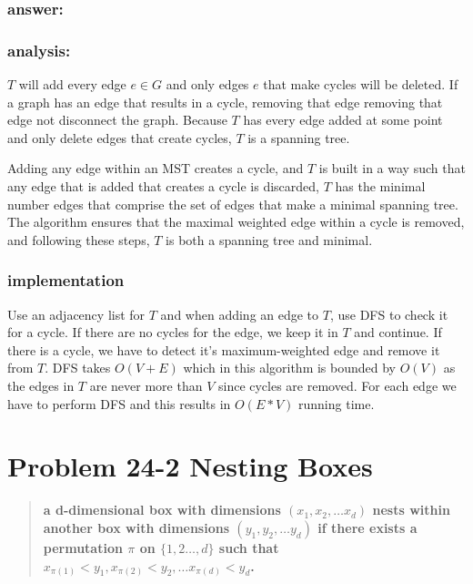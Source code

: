\documentclass[titlepage]{article}
\theoremstyle{definition}
\begin{document}
  \subsubsection{answer:}
  \subsubsection{analysis:}
    $T$ will add every edge $e \in G$ and only edges $e$ that make cycles will
    be deleted. If a graph has an edge that results in a cycle, removing that
    edge removing that edge not disconnect the graph. Because $T$ has every
    edge added at some point and only delete edges that create cycles, $T$ is a
    spanning tree. 

    Adding any  edge within an MST creates a cycle, and $T$ is built in a way
    such that any edge that is added that creates a cycle is discarded, $T$ has
    the minimal number edges that comprise the set of edges that make a minimal
    spanning tree. The algorithm ensures that the maximal weighted edge within
    a cycle is removed, and following these steps, $T$ is both a spanning tree
    and minimal. 

  \subsubsection{implementation}
  Use an adjacency list for $T$ and when adding an edge to $T$, use DFS to
  check it for a cycle. If there are no cycles for the edge, we keep it in 
  $T$ and continue. If there is a cycle, we have to detect it's
  maximum-weighted edge and remove it from $T$. DFS takes $O(V+E)$ which in
  this algorithm is bounded by $O(V)$ as the edges in $T$ are never more than
  $V$ since cycles are removed. For each edge we have to perform DFS and this
  results in $O(E*V)$ running time. 



\section{Problem 24-2 Nesting Boxes}
  \begin{quote}
    \textbf{a d-dimensional box with dimensions $(x_1, x_2, \dots x_d)$
    \textbf{nests} within another box with dimensions $(y_1, y_2, \dots y_d)$
    if there exists a permutation $\pi$ on $\{1,2\dots,d\}$ such that 
    $ x_{\pi(1)} < y_1, x_{\pi(2)} < y_2, \dots x_{\pi(d)} < y_d$.  }
  \end{quote}
\end{document}
